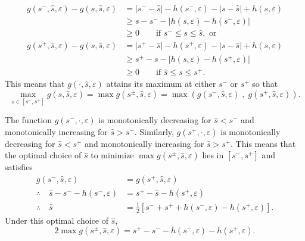 \documentclass{article}[12pt]
\newcommand{\JRComment}[1]{{\color{violet} Jag: #1}}
\begin{document}
\begin{align}
    g(s^-,\hat{s},\varepsilon)-g(s,\hat{s},\varepsilon) 
    &= \lvert s^- - \hat{s} \rvert -h(s^-,\varepsilon) - \lvert s - \hat{s} \rvert  + h(s,\varepsilon) \\
    &\geq s - s^- - \lvert h(s,\varepsilon)-h(s^-,\varepsilon) \rvert  %
    \\
    &\geq 0 \qquad \text{if } s^- \leq s \leq \hat{s}, \text{ or} \\
    g(s^+,\hat{s},\varepsilon)-g(s,\hat{s},\varepsilon) 
    &= \lvert s^+ - \hat{s} \rvert -h(s^+,\varepsilon) - \lvert s - \hat{s} \rvert  + h(s,\varepsilon) \\
    &\geq s^+ - s - \lvert h(s,\varepsilon)-h(s^+,\varepsilon) \rvert \\
    &\geq 0 \qquad \text{if } \hat{s} \leq s \leq s^+.
\end{align}
This means that $g(\cdot,\hat{s},\varepsilon)$ attains its maximum at either $s^-$ or $s^+$ so that
\begin{equation}
    \max_{s \in [s^-,s^+]} g(s,\hat{s},\varepsilon) = \max g(s^\pm,\hat{s},\varepsilon) = \max\left(g(s^-,\hat{s},\varepsilon) \;,\; g(s^+,\hat{s},\varepsilon)\right).
\end{equation}

The function $g(s^-,\cdot,\varepsilon)$ is monotonically decreasing for $\hat{s} < s^-$ and monotonically increasing for $\hat{s} > s^-$. Similarly, $g(s^+,\cdot,\varepsilon)$ is monotonically decreasing for $\hat{s} < s^+$ and monotonically increasing for $\hat{s} > s^+$. This means that the optimal choice of $\hat{s}$ to minimize $\max g(s^\pm,\hat{s},\varepsilon)$ lies in $[s^-,s^+]$ and satisfies
\begin{align}
    g(s^-,\hat{s},\varepsilon) &= g(s^+,\hat{s},\varepsilon) \\
    \therefore \quad \hat{s} - s^- - h(s^-,\varepsilon) &= s^+ - \hat{s} - h(s^+,\varepsilon) \\ 
    \therefore \quad \hat{s} &= \frac{1}{2}\left[ s^- + s^+ +h(s^-,\varepsilon) - h(s^+,\varepsilon) \right]. \label{eq:shat_opt}
\end{align}
Under this optimal choice of $\hat{s}$, 
\begin{equation}
    \label{eq:g_under_shat_opt}
    2 \max g(s^\pm,\hat{s},\varepsilon) =  s^+  -  s^-  - h(s^-,\varepsilon) - h(s^+,\varepsilon).
\end{equation}
\end{document}
